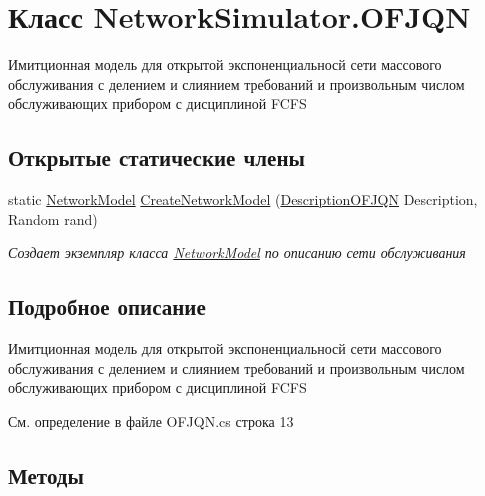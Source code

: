 \hypertarget{class_network_simulator_1_1_o_f_j_q_n}{}\section{Класс Network\+Simulator.\+O\+F\+J\+QN}
\label{class_network_simulator_1_1_o_f_j_q_n}


Имитционная модель для открытой экспоненциальносй сети массового обслуживания с делением и слиянием требований и произвольным числом обслуживающих прибором с дисциплиной F\+C\+FS  


\subsection*{Открытые статические члены}
\begin{DoxyCompactItemize}
\item 
static \hyperlink{class_network_simulator_1_1_network_model}{Network\+Model} \hyperlink{class_network_simulator_1_1_o_f_j_q_n_a6d0939bfdf0bc3c0b96269169506c454}{Create\+Network\+Model} (\hyperlink{class_network_descriptions_1_1_description_o_f_j_q_n}{Description\+O\+F\+J\+QN} Description, Random rand)
\begin{DoxyCompactList}\small\item\em Создает экземпляр класса \hyperlink{class_network_simulator_1_1_network_model}{Network\+Model} по описанию сети обслуживания \end{DoxyCompactList}\end{DoxyCompactItemize}


\subsection{Подробное описание}
Имитционная модель для открытой экспоненциальносй сети массового обслуживания с делением и слиянием требований и произвольным числом обслуживающих прибором с дисциплиной F\+C\+FS 



См. определение в файле O\+F\+J\+Q\+N.\+cs строка 13



\subsection{Методы}
